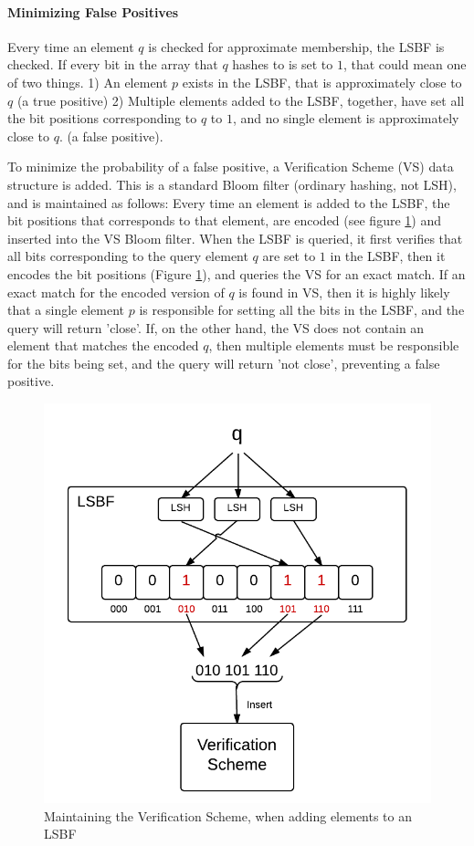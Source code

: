 \documentclass[a4paper,11pt]{article}
\begin{document}
\paragraph{Minimizing False Positives}
Every time an element $q$ is checked for approximate membership, the LSBF is checked. If every bit in the array that $q$ hashes to is set to $1$, that could mean one of two things.
1) An element $p$ exists in the LSBF, that is approximately close to $q$ (a true positive)
2) Multiple elements added to the LSBF, together, have set all the bit positions corresponding to $q$ to $1$, and no single element is approximately close to $q$. (a false positive).

To minimize the probability of a false positive, a Verification Scheme (VS) data structure is added.
This is a standard Bloom filter (ordinary hashing, not LSH), and is maintained as follows: Every time an element is added to the LSBF, the bit positions that corresponds to that element, are encoded (see figure \ref{fig:verification_scheme}) and inserted into the VS Bloom filter.
When the LSBF is queried, it first verifies that all bits corresponding to the query element $q$ are set to $1$ in the LSBF, then it encodes the bit positions (Figure \ref{fig:verification_scheme}), and queries the VS for an exact match. If an exact match for the encoded version of $q$ is found in VS, then it is highly likely that a single element $p$ is responsible for setting all the bits in the LSBF, and the query will return 'close'. If, on the other hand, the VS does not contain an element that matches the encoded $q$, then multiple elements must be responsible for the bits being set, and the query will return 'not close', preventing a false positive.

\begin{figure}[H]
\centering
\includegraphics[width=.5\linewidth]{verification_scheme}
\caption{Maintaining the Verification Scheme, when adding elements to an LSBF}
\label{fig:verification_scheme}
\end{figure}
\end{document}
